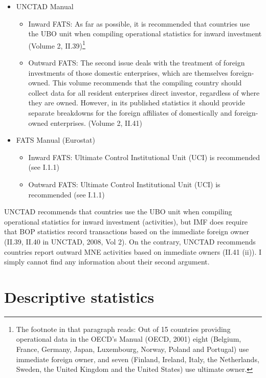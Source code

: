 \documentclass[notitlepage,11pt]{article}%
\begin{document}
\begin{itemize}
\item UNCTAD Manual

\begin{itemize}
\item Inward FATS: As far as possible, it is recommended that countries use
the UBO unit when compiling operational statistics for inward investment
(Volume 2, II.39)\footnote{The footnote in that paragraph reads: Out of 15
countries providing operational data in the OECD's Manual (OECD, 2001) eight
(Belgium, France, Germany, Japan, Luxembourg, Norway, Poland and Portugal) use
immediate foreign owner, and seven (Finland, Ireland, Italy, the Netherlands,
Sweden, the United Kingdom and the United States) use ultimate owner.}

\item Outward FATS: The second issue deals with the treatment of foreign
investments of those domestic enterprises, which are themselves foreign-owned.
This volume recommends that the compiling country should collect data for all
resident enterprises direct investor, regardless of where they are owned.
However, in its published statistics it should provide separate breakdowns for
the foreign affiliates of domestically and foreign-owned enterprises. (Volume
2, II.41)
\end{itemize}

\item FATS Manual (Eurostat)

\begin{itemize}
\item Inward FATS: Ultimate Control Institutional Unit (UCI) is recommended
(see I.1.1)

\item Outward FATS: Ultimate Control Institutional Unit (UCI) is recommended
(see I.1.1)
\end{itemize}
\end{itemize}

UNCTAD recommends that countries use the UBO unit when compiling operational
statistics for inward investment (activities), but IMF does require that BOP
statistics record transactions based on the immediate foreign owner (II.39,
II.40 in UNCTAD, 2008, Vol 2). On the contrary, UNCTAD recommends countries
report outward MNE activities based on immediate owners (II.41 (ii)). I simply
cannot find any information about their second argument.

\section{Descriptive statistics}
\end{document}
